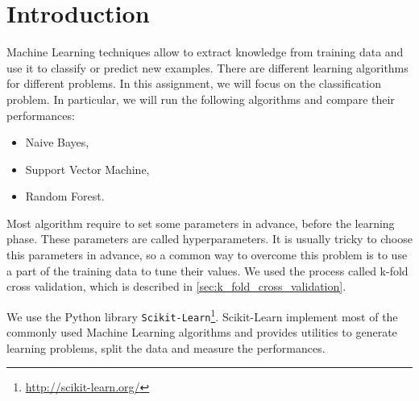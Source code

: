 \section{Introduction}
\label{sec:introduction}

Machine Learning techniques allow to extract knowledge from training data and use it to classify or predict new examples.
There are different learning algorithms for different problems.
In this assignment, we will focus on the classification problem.
In particular, we will run the following algorithms and compare their performances:
\begin{itemize}
    \item Naive Bayes,
    \item Support Vector Machine,
    \item Random Forest.
\end{itemize}

Most algorithm require to set some parameters in advance, before the learning phase.
These parameters are called hyperparameters.
It is usually tricky to choose this parameters in advance, so a common way to overcome this problem is to use a part of the training data to tune their values.
We used the process called k-fold cross validation, which is described in \cref{sec:k_fold_cross_validation}.

We use the Python library \texttt{Scikit-Learn}\footnote{\url{http://scikit-learn.org/}}.
Scikit-Learn implement most of the commonly used Machine Learning algorithms and provides utilities to generate learning problems, split the data and measure the performances.
